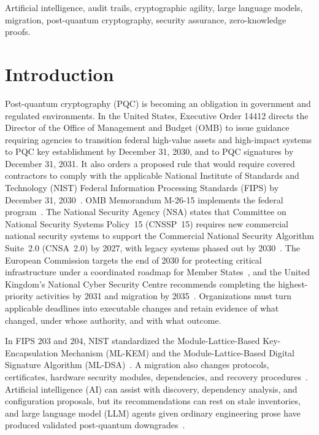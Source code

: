 \begin{IEEEkeywords}
Artificial intelligence, audit trails, cryptographic agility, large language models, migration, post-quantum cryptography, security assurance, zero-knowledge proofs.
\end{IEEEkeywords}

\section{Introduction}
Post-quantum cryptography (PQC) is becoming an obligation in government and regulated environments. In the United States, Executive Order 14412 directs the Director of the Office of Management and Budget (OMB) to issue guidance requiring agencies to transition federal high-value assets and high-impact systems to PQC key establishment by December 31, 2030, and to PQC signatures by December 31, 2031. It also orders a proposed rule that would require covered contractors to comply with the applicable National Institute of Standards and Technology (NIST) Federal Information Processing Standards (FIPS) by December 31, 2030~\cite{eo14412}. OMB Memorandum M-26-15 implements the federal program~\cite{m2615}. The National Security Agency (NSA) states that Committee on National Security Systems Policy~15 (CNSSP~15) requires new commercial national security systems to support the Commercial National Security Algorithm Suite~2.0 (CNSA~2.0) by 2027, with legacy systems phased out by 2030~\cite{nsaarmor}. The European Commission targets the end of 2030 for protecting critical infrastructure under a coordinated roadmap for Member States~\cite{euroadmap,eunews}, and the United Kingdom's National Cyber Security Centre recommends completing the highest-priority activities by 2031 and migration by 2035~\cite{ncsc}. Organizations must turn applicable deadlines into executable changes and retain evidence of what changed, under whose authority, and with what outcome.

In FIPS 203 and 204, NIST standardized the Module-Lattice-Based Key-Encapsulation Mechanism (ML-KEM) and the Module-Lattice-Based Digital Signature Algorithm (ML-DSA)~\cite{fips203,fips204}. A migration also changes protocols, certificates, hardware security modules, dependencies, and recovery procedures~\cite{ir8547,cswp39}. Artificial intelligence (AI) can assist with discovery, dependency analysis, and configuration proposals, but its recommendations can rest on stale inventories, and large language model (LLM) agents given ordinary engineering prose have produced validated post-quantum downgrades~\cite{han}.

